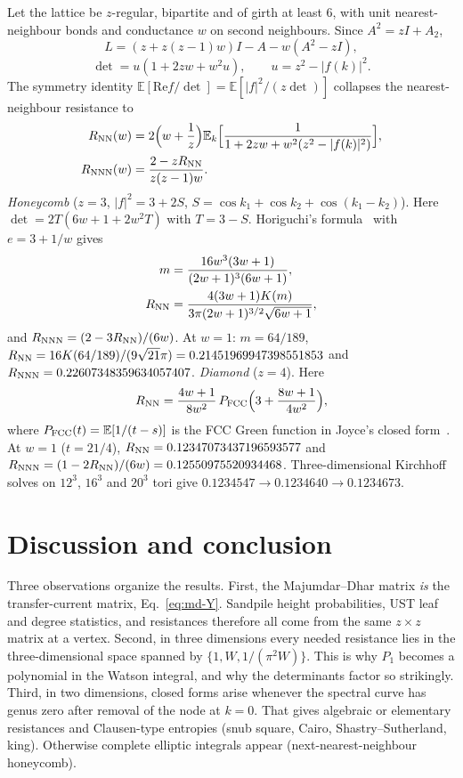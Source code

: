 \documentclass[aps,pre,10pt,twocolumn,superscriptaddress,nofootinbib]{revtex4-2}
\newcommand{\E}{\mathbb{E}}
\begin{document}
Let the lattice be $z$-regular, bipartite and of girth at least 6, with unit nearest-neighbour
bonds and conductance $w$ on second neighbours. Since $A^2=zI+A_2$,
\begin{equation}
L=(z+z(z-1)w)I-A-w(A^2-zI),
\end{equation}
\begin{equation}
\det=u(1+2zw+w^2u),\qquad u=z^2-|f(k)|^2 .
\end{equation}
The symmetry identity $\E[\mathrm{Re}f/\det]=\E[|f|^2/(z\det)]$ collapses the nearest-neighbour resistance to
\begin{align}
R_{\rm NN}(w)&=2\Bigl(w+\frac1z\Bigr)\E_k\Bigl[\frac1{1+2zw+w^2(z^2-|f(k)|^2)}\Bigr],\\
R_{\rm NNN}(w)&=\frac{2-zR_{\rm NN}}{z(z-1)w}.
\end{align}
\emph{Honeycomb} ($z=3$, $|f|^2=3+2S$, $S=\cos k_1+\cos k_2+\cos(k_1-k_2)$). Here
$\det=2T(6w+1+2w^2T)$ with $T=3-S$. Horiguchi's formula~\cite{Horiguchi1972} with $e=3+1/w$ gives
\begin{align}
m&=\frac{16w^3(3w+1)}{(2w+1)^3(6w+1)},\\
R_{\rm NN}&=\frac{4(3w+1)K(m)}{3\pi(2w+1)^{3/2}\sqrt{6w+1}},
\end{align}
and $R_{\rm NNN}=(2-3R_{\rm NN})/(6w)$. At $w=1$: $m=64/189$,
$R_{\rm NN}=16K(64/189)/(9\sqrt{21}\pi)=0.21451969947398551853$ and
$R_{\rm NNN}=0.22607348359634057407$.
\emph{Diamond} ($z=4$). Here
\begin{equation}
R_{\rm NN}=\frac{4w+1}{8w^2}\,P_{\rm FCC}\Bigl(3+\frac{8w+1}{4w^2}\Bigr),
\end{equation}
where $P_{\rm FCC}(t)=\E[1/(t-s)]$ is the FCC Green function in Joyce's closed form~\cite{Joyce1998}. At $w=1$
($t=21/4$), $R_{\rm NN}=0.12347073437196593577$ and $R_{\rm NNN}=(1-2R_{\rm NN})/(6w)=0.12550975520934468$.
Three-dimensional Kirchhoff solves on $12^3$, $16^3$ and $20^3$ tori give
$0.1234547\to0.1234640\to0.1234673$.

\section{Discussion and conclusion}
\label{sec:conclusion}

Three observations organize the results. First, the Majumdar--Dhar matrix \emph{is} the
transfer-current matrix, Eq.~\eqref{eq:md-Y}. Sandpile height probabilities, UST leaf and degree
statistics, and resistances therefore all come from the same $z\times z$ matrix at a vertex. Second, in
three dimensions every needed resistance lies in the three-dimensional space spanned by
$\{1,W,1/(\pi^2W)\}$. This is why $P_1$ becomes a polynomial in the Watson integral, and why the
determinants factor so strikingly. Third, in two dimensions, closed forms arise whenever the spectral curve has
genus zero after removal of the node at $k=0$. That gives algebraic or elementary resistances and
Clausen-type entropies (snub square, Cairo, Shastry--Sutherland, king). Otherwise complete elliptic
integrals appear (next-nearest-neighbour honeycomb).
\end{document}
